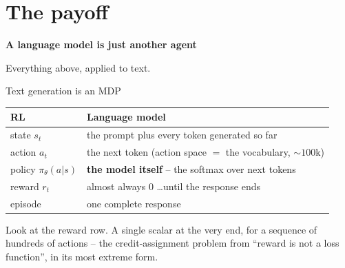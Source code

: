 \documentclass[aspectratio=169]{beamer}
\begin{document}
\section{The payoff}
\begin{frame}[plain]
  \begin{center}
    \vskip 1.6cm
    {\Huge\bfseries\color{popblue}A language model is just another agent}

    \vskip 0.6cm
    {\large Everything above, applied to text.}
  \end{center}
\end{frame}

\begin{frame}{Text generation is an MDP}
  \begin{center}
  \small
  \begin{tabular}{l l}
    \toprule
    \textbf{RL} & \textbf{Language model} \\
    \midrule
    state $s_t$ & the prompt plus every token generated so far \\
    action $a_t$ & the next token (action space $=$ the vocabulary, $\sim$$100$k) \\
    policy $\pi_\theta(a|s)$ & \textbf{the model itself} -- the softmax over next tokens \\
    reward $r_t$ & almost always $0$ \dots until the response ends \\
    episode & one complete response \\
    \bottomrule
  \end{tabular}
  \end{center}

  \vskip 10pt
  \begin{tcolorbox}[colback=armblue!8, colframe=armblue, boxrule=0.6pt, arc=2pt]
    \small
    Look at the reward row. A single scalar at the very end, for a sequence of hundreds of
    actions -- the credit-assignment problem from ``reward is not a loss function'', in its most
    extreme form.
  \end{tcolorbox}
\end{frame}
\end{document}
